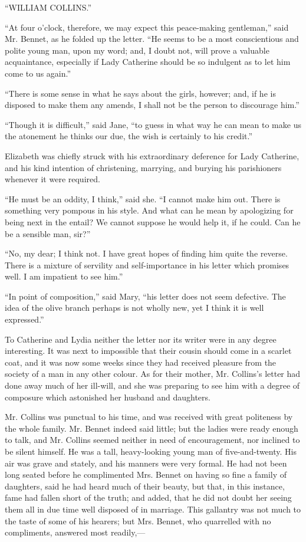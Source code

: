 ``WILLIAM COLLINS.''

``At four o'clock, therefore, we may expect this peace-making gentleman,'' said Mr. Bennet, as he folded up the letter. ``He seems to be a most conscientious and polite young man, upon my word; and, I doubt not, will prove a valuable acquaintance, especially if Lady Catherine should be so indulgent as to let him come to us again.''

``There is some sense in what he says about the girls, however; and, if he is disposed to make them any amends, I shall not be the person to discourage him.''

``Though it is difficult,'' said Jane, ``to guess in what way he can mean to make us the atonement he thinks our due, the wish is certainly to his credit.''

Elizabeth was chiefly struck with his extraordinary deference for Lady Catherine, and his kind intention of christening, marrying, and burying his parishioners whenever it were required.

``He must be an oddity, I think,'' said she. ``I cannot make him out. There is something very pompous in his style. And what can he mean by apologizing for being next in the entail? We cannot suppose he would help it, if he could. Can he be a sensible man, sir?''

``No, my dear; I think not. I have great hopes of finding him quite the reverse. There is a mixture of servility and self-importance in his letter which promises well. I am impatient to see him.''

``In point of composition,'' said Mary, ``his letter does not seem defective. The idea of the olive branch perhaps is not wholly new, yet I think it is well expressed.''

To Catherine and Lydia neither the letter nor its writer were in any degree interesting. It was next to impossible that their cousin should come in a scarlet coat, and it was now some weeks since they had received pleasure from the society of a man in any other colour. As for their mother, Mr. Collins's letter had done away much of her ill-will, and she was preparing to see him with a degree of composure which astonished her husband and daughters.

Mr. Collins was punctual to his time, and was received with great politeness by the whole family. Mr. Bennet indeed said little; but the ladies were ready enough to talk, and Mr. Collins seemed neither in need of encouragement, nor inclined to be silent himself. He was a tall, heavy-looking young man of five-and-twenty. His air was grave and stately, and his manners were very formal. He had not been long seated before he complimented Mrs. Bennet on having so fine a family of daughters, said he had heard much of their beauty, but that, in this instance, fame had fallen short of the truth; and added, that he did not doubt her seeing them all in due time well disposed of in marriage. This gallantry was not much to the taste of some of his hearers; but Mrs. Bennet, who quarrelled with no compliments, answered most readily,---

